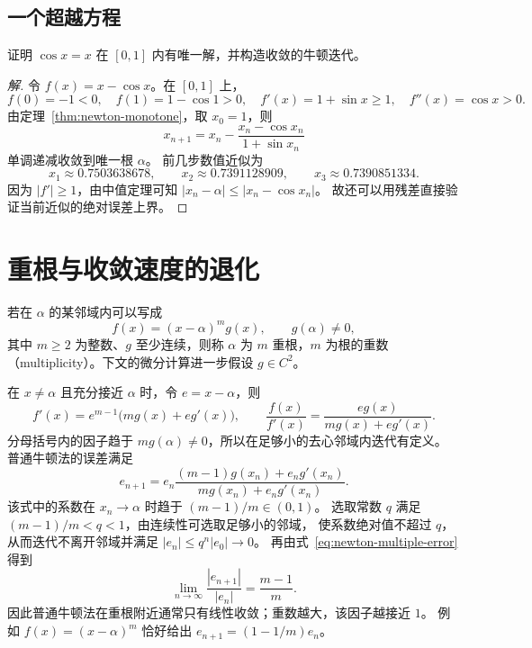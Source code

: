 \documentclass[UTF8,12pt,a4paper,fontset=fandol]{ctexart}
\begin{document}
\subsection{一个超越方程}

\begin{example}[求解余弦不动点]\label{ex:newton-cos}
证明 $\cos x=x$ 在 $[0,1]$ 内有唯一解，并构造收敛的牛顿迭代。
\end{example}

\begin{proof}[解]
令 $f(x)=x-\cos x$。在 $[0,1]$ 上，
\[
  f(0)=-1<0,\quad f(1)=1-\cos1>0,\quad
  f'(x)=1+\sin x\ge1,\quad f''(x)=\cos x>0.
\]
由定理~\ref{thm:newton-monotone}，取 $x_0=1$，则
\[
  x_{n+1}=x_n-\frac{x_n-\cos x_n}{1+\sin x_n}
\]
单调递减收敛到唯一根 $\alpha$。
前几步数值近似为
\[
  x_1\approx0.7503638678,\qquad
  x_2\approx0.7391128909,\qquad
  x_3\approx0.7390851334.
\]
因为 $|f'|\ge1$，由中值定理可知 $|x_n-\alpha|\le|x_n-\cos x_n|$。
故还可以用残差直接验证当前近似的绝对误差上界。
\end{proof}

\section{重根与收敛速度的退化}
\label{sec:newton-multiple}

\begin{definition}[重根]
若在 $\alpha$ 的某邻域内可以写成
\[
  f(x)=(x-\alpha)^m g(x),\qquad g(\alpha)\ne0,
\]
其中 $m\ge2$ 为整数、$g$ 至少连续，则称 $\alpha$ 为 $m$ 重根，$m$ 为根的重数
（multiplicity）。下文的微分计算进一步假设 $g\in C^2$。
\end{definition}

在 $x\ne\alpha$ 且充分接近 $\alpha$ 时，令 $e=x-\alpha$，则
\[
  f'(x)=e^{m-1}\bigl(mg(x)+eg'(x)\bigr),\qquad
  \frac{f(x)}{f'(x)}=\frac{eg(x)}{mg(x)+eg'(x)}.
\]
分母括号内的因子趋于 $mg(\alpha)\ne0$，所以在足够小的去心邻域内迭代有定义。
普通牛顿法的误差满足
\begin{equation}\label{eq:newton-multiple-error}
  e_{n+1}=e_n\frac{(m-1)g(x_n)+e_ng'(x_n)}{mg(x_n)+e_ng'(x_n)}.
\end{equation}
该式中的系数在 $x_n\to\alpha$ 时趋于 $(m-1)/m\in(0,1)$。
选取常数 $q$ 满足 $(m-1)/m<q<1$，由连续性可选取足够小的邻域，
使系数绝对值不超过 $q$，从而迭代不离开邻域并满足 $|e_n|\le q^n|e_0|\to0$。
再由式~\eqref{eq:newton-multiple-error} 得到
\[
  \lim_{n\to\infty}\frac{|e_{n+1}|}{|e_n|}=\frac{m-1}{m}.
\]
因此普通牛顿法在重根附近通常只有线性收敛；重数越大，该因子越接近 $1$。
例如 $f(x)=(x-\alpha)^m$ 恰好给出 $e_{n+1}=(1-1/m)e_n$。
\end{document}
